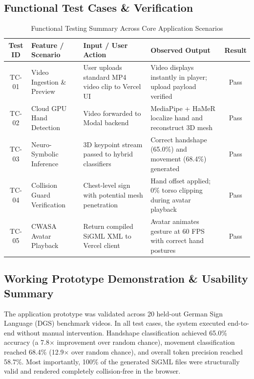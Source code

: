 \documentclass[11pt, a4paper]{article}
\begin{document}
\subsection{Functional Test Cases \& Verification}
\begin{table}[H]
    \centering
    \footnotesize
    \renewcommand{\arraystretch}{1.25}
    \begin{tabular}{|c|p{3.0cm}|p{3.4cm}|p{4.2cm}|c|}
        \hline
        \textbf{Test ID} & \textbf{Feature / Scenario} & \textbf{Input / User Action} & \textbf{Observed Output} & \textbf{Result} \\
        \hline
        TC-01 & Video Ingestion \& Preview & User uploads standard MP4 video clip to Vercel UI & Video displays instantly in player; upload payload verified & Pass \\
        \hline
        TC-02 & Cloud GPU Hand Detection & Video forwarded to Modal backend & MediaPipe + HaMeR localize hand and reconstruct 3D mesh & Pass \\
        \hline
        TC-03 & Neuro-Symbolic Inference & 3D keypoint stream passed to hybrid classifiers & Correct handshape (65.0\%) and movement (68.4\%) generated & Pass \\
        \hline
        TC-04 & Collision Guard Verification & Chest-level sign with potential mesh penetration & Hand offset applied; 0\% torso clipping during avatar playback & Pass \\
        \hline
        TC-05 & CWASA Avatar Playback & Return compiled SiGML XML to Vercel client & Avatar animates gesture at 60 FPS with correct hand postures & Pass \\
        \hline
    \end{tabular}
    \caption{Functional Testing Summary Across Core Application Scenarios}
\end{table}

\subsection{Working Prototype Demonstration \& Usability Summary}
The application prototype was validated across 20 held-out German Sign Language (DGS) benchmark videos. In all test cases, the system executed end-to-end without manual intervention. Handshape classification achieved 65.0\% accuracy (a 7.8$\times$ improvement over random chance), movement classification reached 68.4\% (12.9$\times$ over random chance), and overall token precision reached 58.7\%. Most importantly, 100\% of the generated SiGML files were structurally valid and rendered completely collision-free in the browser.
\end{document}
